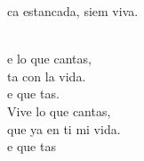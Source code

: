 \documentclass[12pt]{article}
\begin{document}
\begin{multicols*}{2}
\begin{cancion}
	ca estancada, siem viva. \\\jump\\
	\begin{chorus}%
	e lo que cantas, \\
	ta con la vida.\\
	e que tas.\\
Vive lo que cantas,\\
	que ya en ti mi vida.\\
	e que tas    \\
	\end{chorus}%
	\jump\\
\end{cancion}%


\end{multicols*}
\end{document}

